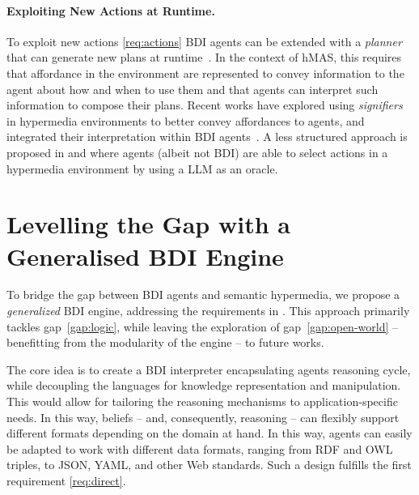 \documentclass[
]{ceurart}
\begin{document}
\paragraph{Exploiting New Actions at Runtime.}

To exploit new actions \ref{req:actions} \ac{BDI} agents can be extended with a \emph{planner} that can generate new plans at runtime~\cite{MeneguzziS15}. 
In the context of \ac{hMAS}, this requires that affordance in the environment are represented to convey information to the agent about how and when to use them and that agents can interpret such information to compose their plans.
%
Recent works have explored using \emph{signifiers}~\cite{vachtsevanou2023atal} in hypermedia environments to better convey affordances to agents, and integrated their interpretation within \ac{BDI} agents~\cite{vachtsevanou2024atal}.
%
A less structured approach is proposed in \cite{10.1145/3603163.3609077} and \cite{schmid2024kgswc} where agents (albeit not \ac{BDI}) are able to select actions in a hypermedia environment by using a \ac{LLM} as an oracle.

\section{Levelling the Gap with a Generalised \ac{BDI} Engine}
\label{sec:generalized-bdi-engine}

To bridge the gap between \ac{BDI} agents and semantic hypermedia,
we propose a \emph{generalized} \ac{BDI} engine,
addressing the requirements in .
%
This approach primarily tackles gap~\ref{gap:logic}, while leaving the exploration of gap~\ref{gap:open-world} -- benefitting from the modularity of the engine -- to future works.

The core idea is to create a \ac{BDI} interpreter encapsulating agents reasoning cycle, 
while decoupling the languages for knowledge representation and manipulation. 
%
This would allow for tailoring the reasoning mechanisms to application-specific needs.
%
In this way, 
beliefs 
-- and, consequently, reasoning -- 
can flexibly support different formats depending on the domain at hand.
%
In this way, 
agents can easily be adapted to work with different data formats,
ranging from \ac{RDF} and \ac{OWL} triples, to JSON, YAML, and other Web standards. 
%
Such a design fulfills the first requirement \ref{req:direct}.
\end{document}

